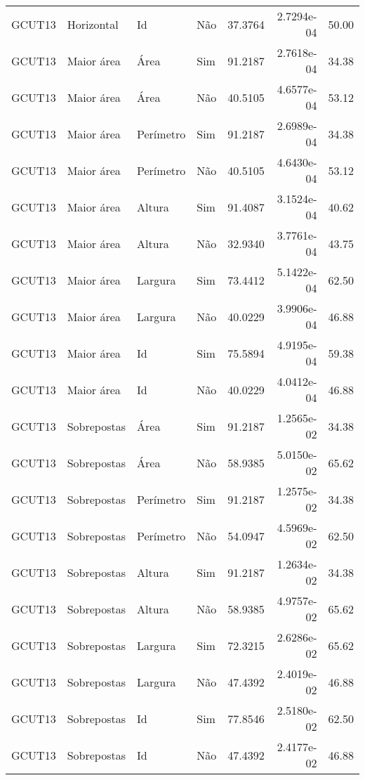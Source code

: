 \begin{tabular}{llllrrr}
GCUT13    & Horizontal  & Id        & Não         & 37.3764      & 2.7294e-04 & 50.00    \\
GCUT13    & Maior área  & Área      & Sim         & 91.2187      & 2.7618e-04 & 34.38    \\
GCUT13    & Maior área  & Área      & Não         & 40.5105      & 4.6577e-04 & 53.12    \\
GCUT13    & Maior área  & Perímetro & Sim         & 91.2187      & 2.6989e-04 & 34.38    \\
GCUT13    & Maior área  & Perímetro & Não         & 40.5105      & 4.6430e-04 & 53.12    \\
GCUT13    & Maior área  & Altura    & Sim         & 91.4087      & 3.1524e-04 & 40.62    \\
GCUT13    & Maior área  & Altura    & Não         & 32.9340      & 3.7761e-04 & 43.75    \\
GCUT13    & Maior área  & Largura   & Sim         & 73.4412      & 5.1422e-04 & 62.50    \\
GCUT13    & Maior área  & Largura   & Não         & 40.0229      & 3.9906e-04 & 46.88    \\
GCUT13    & Maior área  & Id        & Sim         & 75.5894      & 4.9195e-04 & 59.38    \\
GCUT13    & Maior área  & Id        & Não         & 40.0229      & 4.0412e-04 & 46.88    \\
GCUT13    & Sobrepostas & Área      & Sim         & 91.2187      & 1.2565e-02 & 34.38    \\
GCUT13    & Sobrepostas & Área      & Não         & 58.9385      & 5.0150e-02 & 65.62    \\
GCUT13    & Sobrepostas & Perímetro & Sim         & 91.2187      & 1.2575e-02 & 34.38    \\
GCUT13    & Sobrepostas & Perímetro & Não         & 54.0947      & 4.5969e-02 & 62.50    \\
GCUT13    & Sobrepostas & Altura    & Sim         & 91.2187      & 1.2634e-02 & 34.38    \\
GCUT13    & Sobrepostas & Altura    & Não         & 58.9385      & 4.9757e-02 & 65.62    \\
GCUT13    & Sobrepostas & Largura   & Sim         & 72.3215      & 2.6286e-02 & 65.62    \\
GCUT13    & Sobrepostas & Largura   & Não         & 47.4392      & 2.4019e-02 & 46.88    \\
GCUT13    & Sobrepostas & Id        & Sim         & 77.8546      & 2.5180e-02 & 62.50    \\
GCUT13    & Sobrepostas & Id        & Não         & 47.4392      & 2.4177e-02 & 46.88    \\
\hline
\end{tabular}